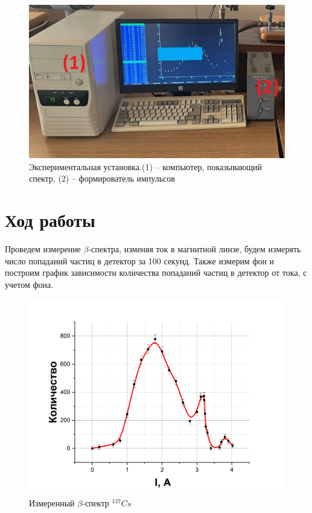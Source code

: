 \documentclass[a4paper,12pt]{article}
\begin{document}
\begin{figure}[h]
	\centering
	\includegraphics[width=0.8\linewidth]{fig4 (setup_3)}			
	\caption{Экспериментальная установка.(1) -- компьютер, показывающий спектр, (2) -- формирователь импульсов}
	\label{fig3:setup_2}
\end{figure}

\pagebreak

\section*{Ход работы}

Проведем измерение $\beta$-спектра, изменяя ток в магнитной линзе, будем измерять число попаданий частиц в детектор за 100 секунд. Также измерим фон и построим график зависимости количества попаданий частиц в детектор от тока, с учетом фона.

\begin{figure}[h!]
	\centering
	\includegraphics[width=0.9\linewidth]{graph1 (spectre)}
	\caption{Измеренный $\beta$-спектр $^{137}Cs$}
	\label{graph1:spectre}
\end{figure}
\end{document}
